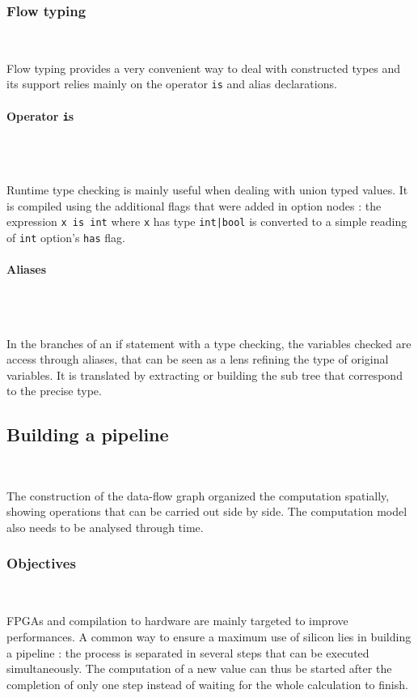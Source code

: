 \documentclass[10pt,a4paper]{article}
\newcommand{\code}{\texttt}
\renewcommand{\indent}{~\\\vspace{-.8cm}}
\newcommand{\whileyLine}{\lstinline[language=Whiley,basicstyle=\normalsize\ttfamily]}
\begin{document}
\subsubsection{Flow typing}
\label{FlowT}\indent

Flow typing provides a very convenient way to deal with constructed types and its support relies mainly on the operator \code {is} and alias declarations.


\paragraph{Operator \code is}~\\\indent

Runtime type checking is mainly useful when dealing with union typed values. It is compiled using the additional flags that were added in option nodes : the expression \whileyLine {x is int} where \whileyLine {x} has type \whileyLine {int|bool} is converted to a simple reading of \whileyLine{int} option's \code {has} flag.

\paragraph{Aliases}~\\\indent

In the branches of an if statement with a type checking, the variables checked are access through aliases, that can be seen as a lens refining the type of original variables. It is translated by extracting or building the sub tree that correspond to the precise type.


\subsection{Building a pipeline}
\label{Opts}
\indent

The construction of the data-flow graph organized the computation spatially, showing operations that can be carried out side by side. The computation model also needs to be analysed through time.

\subsubsection{Objectives}
\indent

FPGAs and compilation to hardware are mainly targeted to improve performances. A common way to ensure a maximum use of silicon lies in building a pipeline : the process is separated in several steps that can be executed simultaneously. The computation of a new value can thus be started after the completion of only one step instead of waiting for the whole calculation to finish.\\
\end{document}
